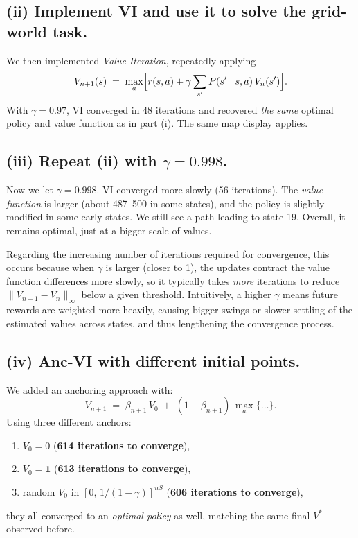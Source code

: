 \subsection*{(ii) Implement VI and use it to solve the grid-world task.}

\noindent
We then implemented \emph{Value Iteration}, repeatedly applying
\[
  V_{n+1}(s) 
   \;=\;\max_{a}\Bigl[r(s,a) + \gamma\sum_{s'}P(s'\mid s,a)\,V_{n}(s')\Bigr].
\]
With \(\gamma=0.97\), VI converged in 48 iterations and recovered \emph{the same} 
optimal policy and value function as in part (i). The same map display applies.

\subsection*{(iii) Repeat (ii) with \(\gamma=0.998\).}

\noindent
Now we let \(\gamma=0.998\).  VI converged more slowly (56 iterations). 
The \emph{value function} is larger (about 487--500 in some states), 
and the policy is slightly modified in some early states.  
We still see a path leading to state 19. 
Overall, it remains optimal, just at a bigger scale of values.

Regarding the increasing number of iterations required for convergence, this occurs because when \(\gamma\) is larger (closer to 1), the updates contract the value function differences more slowly, so it typically takes \emph{more} iterations to reduce \( \|V_{n+1} - V_n\|_{\infty} \) below a given threshold. Intuitively, a higher \(\gamma\) means future rewards are weighted more heavily, causing bigger swings or slower settling of the estimated values across states, and thus lengthening the convergence process.


\subsection*{(iv) Anc-VI with different initial points.}

\noindent
We added an anchoring approach with:
\[
  V_{n+1} 
   \;=\;\beta_{n+1}\,V_0 \;+\;(1-\beta_{n+1})\,\max_{a}\{\dots\}.
\]
Using three different anchors:
\begin{enumerate}[label=(\alph*)]
\item $V_0=0$ \quad(\textbf{614 iterations to converge}),
\item $V_0= \mathbf{1}$ \quad(\textbf{613 iterations to converge}),
\item random $V_0$ in $[0,\,1/(1-\gamma)]^{nS}$ \quad(\textbf{606 iterations to converge}),
\end{enumerate}
they all converged to an \emph{optimal policy} as well, matching the same final $V^*$ observed before.  


